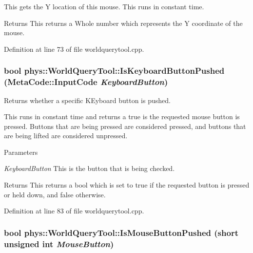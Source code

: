 This gets the Y location of this mouse. This runs in constant time. \begin{DoxyReturn}{Returns}
This returns a Whole number which represents the Y coordinate of the mouse. 
\end{DoxyReturn}


Definition at line 73 of file worldquerytool.cpp.

\hypertarget{classphys_1_1WorldQueryTool_a8343f54b900adb316ddc6de5405da328}{
\subsubsection[{IsKeyboardButtonPushed}]{\setlength{\rightskip}{0pt plus 5cm}bool phys::WorldQueryTool::IsKeyboardButtonPushed ({\bf MetaCode::InputCode} {\em KeyboardButton})}}
\label{d8/d69/classphys_1_1WorldQueryTool_a8343f54b900adb316ddc6de5405da328}


Returns whether a specific KEyboard button is pushed. 

This runs in constant time and returns a true is the requested mouse button is pressed. Buttons that are being pressed are considered pressed, and buttons that are being lifted are considered unpressed. 
\begin{DoxyParams}{Parameters}
\item[{\em KeyboardButton}]This is the button that is being checked. \end{DoxyParams}
\begin{DoxyReturn}{Returns}
This returns a bool which is set to true if the requested button is pressed or held down, and false otherwise. 
\end{DoxyReturn}


Definition at line 83 of file worldquerytool.cpp.

\hypertarget{classphys_1_1WorldQueryTool_af277b578432dfaefffbc4fd9bb80ca64}{
\subsubsection[{IsMouseButtonPushed}]{\setlength{\rightskip}{0pt plus 5cm}bool phys::WorldQueryTool::IsMouseButtonPushed (short unsigned int {\em MouseButton})}}
\label{d8/d69/classphys_1_1WorldQueryTool_af277b578432dfaefffbc4fd9bb80ca64}


